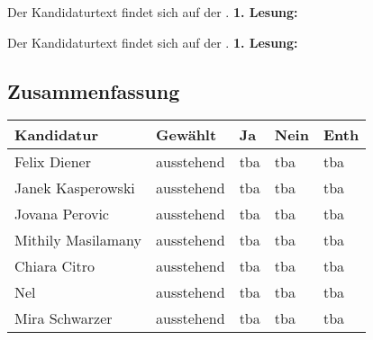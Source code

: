 {
    Der Kandidaturtext findet sich auf der \kandidaturenseite.
}
{
    \textbf{1. Lesung:}
    \ul{
        \ul{}
    }
}

{
    Der Kandidaturtext findet sich auf der \kandidaturenseite.
}
{
    \textbf{1. Lesung:}
}

\subsection{Zusammenfassung}
\begin{center} %
    \begin{tabular}{|p{6cm}|m{2cm}|m{1cm}|m{1cm}|m{1cm}|}
        \hline
        Kandidatur & Gewählt & Ja & Nein & Enth\\\hline
        Felix Diener & ausstehend & tba & tba & tba\\\hline
        Janek Kasperowski & ausstehend & tba & tba & tba\\\hline
        Jovana Perovic & ausstehend & tba & tba & tba\\\hline
        Mithily Masilamany & ausstehend & tba & tba & tba\\\hline
        Chiara Citro & ausstehend & tba & tba & tba\\\hline
        Nel & ausstehend & tba & tba & tba\\\hline
        Mira Schwarzer & ausstehend & tba & tba & tba\\\hline
    \end{tabular}
\end{center}
